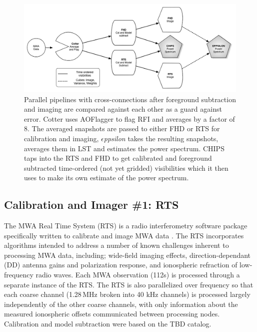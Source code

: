 \documentclass[preprint]{aastex}
\def\eppsilon{{\it $\epsilon$ppsilon }}
\begin{document}
\begin{figure}[htbp]
\begin{center}
\includegraphics[width=\textwidth]{figures/MWA_Pipes.png}
\caption{Parallel pipelines with cross-connections after foreground subtraction and imaging are compared against each other as a guard against error.  Cotter uses AOFlagger to flag RFI and averages by a factor of 8. The averaged snapshots are passed to either FHD or RTS for calibration and imaging, \eppsilon takes the resulting snapshots, averages them in LST and estimates the power spectrum. CHIPS taps into the RTS and FHD to get calibrated and foreground subtracted time-ordered (not yet gridded) visibilities which it then uses to make its own estimate of the power spectrum. }
\label{fig:pipes}
\end{center}
\end{figure}

\subsection{Calibration and Imager \#1: RTS}
\label{sec:RTS}
The MWA Real Time System (RTS) is a radio interferometry software package specifically written to calibrate and image MWA data \citep[][Mitchell et al. in prep]{Ord:2010p7534}. The RTS incorporates algorithms intended to address a number of known challenges inherent to processing MWA data, including; wide-field imaging effects, direction-dependant (DD) antenna gains and polarization response, and ionospheric refraction of low-frequency radio waves. Each MWA observation (112s) is processed through a separate instance of the RTS. The RTS is also parallelized over frequency so that each coarse channel (1.28\,MHz broken into 40 kHz channels) is processed largely independently of the other coarse channels, with only information about the measured ionospheric offsets communicated between processing nodes.  Calibration and model subtraction were based on the TBD catalog. 
\end{document}
